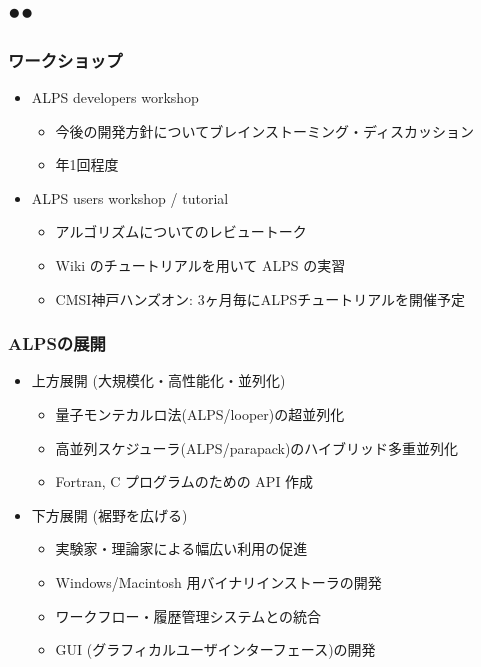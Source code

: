 \subsection*{{\protect\color{red}●}{\protect\color{blue}●}}

\begin{frame}
  \frametitle{ワークショップ}
  \begin{itemize}
    \setlength{\itemsep}{1em}
  \item ALPS developers workshop
    \begin{itemize}
      \item 今後の開発方針についてブレインストーミング・ディスカッション
      \item 年1回程度
    \end{itemize}
  \item ALPS users workshop / tutorial
    \begin{itemize}
      \item アルゴリズムについてのレビュートーク
      \item Wiki のチュートリアルを用いて ALPS の実習
      \item CMSI神戸ハンズオン: 3ヶ月毎にALPSチュートリアルを開催予定
    \end{itemize}
  \end{itemize}
\end{frame}

\begin{frame}
  \frametitle{ALPSの展開}
  \begin{itemize}
    \setlength{\itemsep}{1em}
  \item 上方展開 (大規模化・高性能化・並列化)
    \begin{itemize}
    \item 量子モンテカルロ法(ALPS/looper)の超並列化
    \item 高並列スケジューラ(ALPS/parapack)のハイブリッド多重並列化
    \item Fortran, C プログラムのための API 作成
    \end{itemize}
  \item 下方展開 (裾野を広げる)
    \begin{itemize}
    \item 実験家・理論家による幅広い利用の促進
    \item Windows/Macintosh 用バイナリインストーラの開発
    \item ワークフロー・履歴管理システムとの統合
    \item GUI (グラフィカルユーザインターフェース)の開発
    \end{itemize}
  \end{itemize}
\end{frame}

